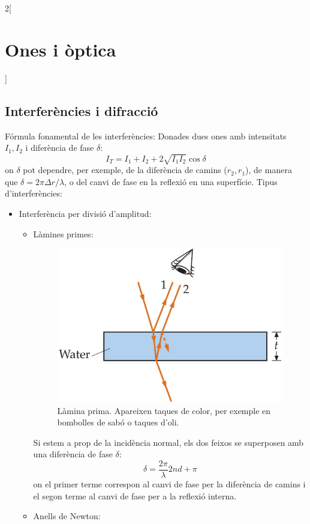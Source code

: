 \documentclass[class=article,10pt,crop=false]{standalone}
\begin{document}
\begin{multicols}{2}[\section{Ones i òptica}]
\subsection{Interferències i difracció}
Fórmula fonamental de les interferències: Donades dues ones amb intensitats $I_1,I_2$ i diferència de fase $\delta$: $$I_T=I_1+I_2+2\sqrt{I_1I_2}\cos\delta$$
{\footnotesize on $\delta$ pot dependre, per exemple, de la diferència de camins ($r_2,r_1$), de manera que $\delta=2\pi\Delta r/\lambda$, o del canvi de fase en la reflexió en una superfície.}\newline
Tipus d'interferències:
\begin{itemize}
    \item Interferència per divisió d'amplitud:
    \begin{itemize}
        \item Làmines primes:\newline
        \begin{figure}[ht]
           \centering \includegraphics[width=\linewidth]{Physics/1st/Ones_i_optica/Imatges/lamprim.jpg} 
            \caption{Làmina prima. Apareixen taques de color, per exemple en bombolles de sabó o taques d'oli.}
        \end{figure}
Si estem a prop de la incidència normal, els dos feixos se superposen amb una diferència de fase $\delta$: $$\delta=\frac{2\pi}{\lambda}2nd+\pi$$ {\footnotesize on el primer terme correspon al canvi de fase per la diferència de camins i el segon terme al canvi de fase per a la reflexió interna.}
        \item Anells de Newton:\newline
        \begin{figure}[ht]

\end{figure}
\end{itemize}
\end{itemize}
\end{multicols}
\end{document}
